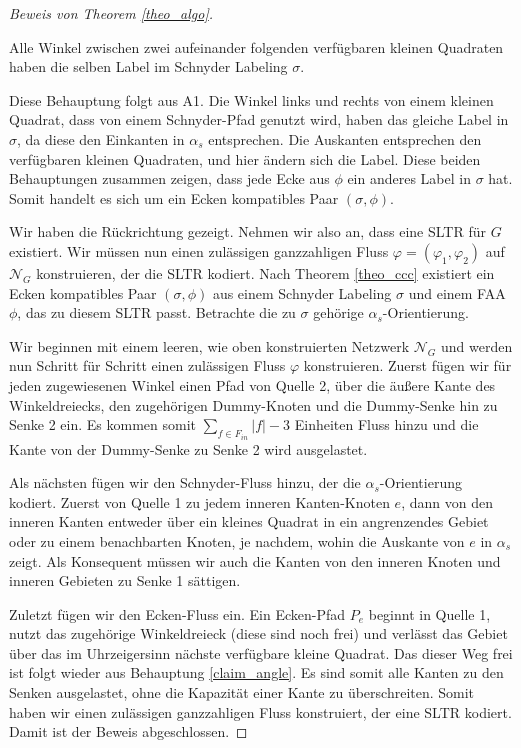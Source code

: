 \begin{proof}[Beweis von Theorem \ref{theo_algo}]
\begin{claim}\label{claim_angle}
Alle Winkel zwischen zwei aufeinander folgenden verfügbaren kleinen Quadraten haben die selben Label im Schnyder Labeling $\sigma$.
\end{claim}

Diese Behauptung folgt aus A1. Die Winkel links und rechts von einem kleinen Quadrat, dass von einem Schnyder-Pfad genutzt wird, haben das gleiche Label in $\sigma$, da diese den Einkanten in $\alpha_s$ entsprechen. Die Auskanten entsprechen den verfügbaren kleinen Quadraten, und hier ändern sich die Label. Diese beiden Behauptungen zusammen zeigen, dass jede Ecke aus $\phi$ ein anderes Label in $\sigma$ hat. Somit handelt es sich um ein Ecken kompatibles Paar $(\sigma,\phi)$.

Wir haben die Rückrichtung gezeigt. Nehmen wir also an, dass eine SLTR für $G$ existiert. Wir müssen nun einen zulässigen ganzzahligen Fluss $\varphi=(\varphi_1,\varphi_2)$ auf $\mathcal{N}_G$ konstruieren, der die SLTR kodiert. Nach Theorem \ref{theo_ccc} existiert ein Ecken kompatibles Paar $(\sigma,\phi)$ aus einem Schnyder Labeling $\sigma$ und einem FAA $\phi$, das zu diesem SLTR passt. Betrachte die zu $\sigma$ gehörige $\alpha_s$-Orientierung.

Wir beginnen mit einem leeren, wie oben konstruierten Netzwerk $\mathcal{N}_G$ und werden nun Schritt für Schritt einen zulässigen Fluss $\varphi$ konstruieren. Zuerst fügen wir für jeden zugewiesenen Winkel einen Pfad von Quelle 2, über die äußere Kante des Winkeldreiecks, den zugehörigen Dummy-Knoten und die Dummy-Senke hin zu Senke 2 ein. Es kommen somit $\sum_{f \in F_{in}}|f|-3$ Einheiten Fluss hinzu und die Kante von der Dummy-Senke zu Senke 2 wird ausgelastet. 

Als nächsten fügen wir den Schnyder-Fluss hinzu, der die $\alpha_s$-Orientierung kodiert. Zuerst von Quelle 1 zu jedem inneren Kanten-Knoten $e$, dann von den inneren Kanten entweder über ein kleines Quadrat in ein angrenzendes Gebiet oder zu einem benachbarten Knoten, je nachdem, wohin die Auskante von $e$ in $\alpha_s$ zeigt. Als Konsequent müssen wir auch die Kanten von den inneren Knoten und inneren Gebieten zu Senke 1 sättigen.

Zuletzt fügen wir den Ecken-Fluss ein. Ein Ecken-Pfad $P_e$ beginnt in Quelle 1, nutzt das zugehörige Winkeldreieck (diese sind noch frei) und verlässt das Gebiet über das im Uhrzeigersinn nächste verfügbare kleine Quadrat. Das dieser Weg frei ist folgt wieder aus Behauptung \ref{claim_angle}. Es sind somit alle Kanten zu den Senken ausgelastet, ohne die Kapazität einer Kante zu überschreiten. Somit haben wir einen zulässigen ganzzahligen Fluss konstruiert, der eine SLTR kodiert. Damit ist der Beweis abgeschlossen.
\end{proof}

